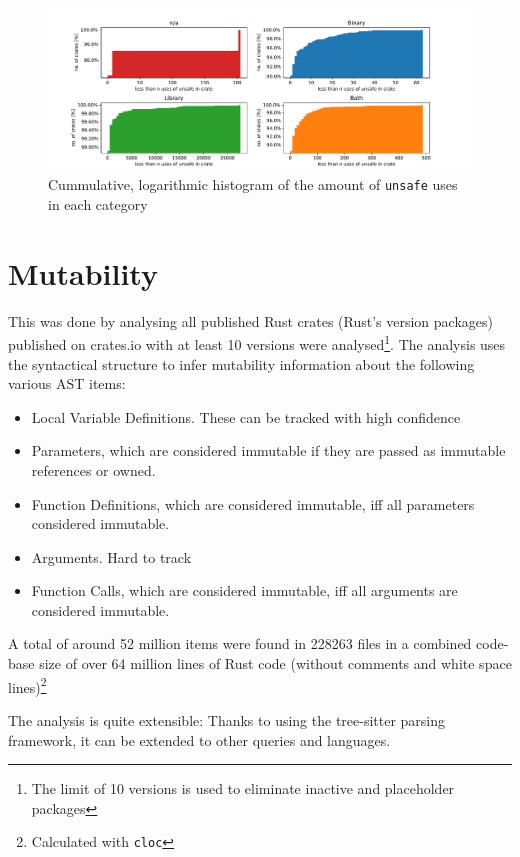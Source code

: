 \documentclass{book}
\newcommand{\code}[1]{\texttt{#1}}
\theoremstyle{definition}
\begin{document}
\begin{figure}[h]
	\centering
	\includegraphics[width=0.99\linewidth, clip, trim={0.2cm 0.2cm 0.2cm 0.2cm}]{../unsafe_counts_by_crate_type.pdf}
	\caption{Cummulative, logarithmic histogram of the amount of \code{unsafe} uses in each category}
	\label{fig:unsafe-hist}
\end{figure}


\section{Mutability}

This was done by analysing all published Rust crates (Rust's version packages) published on crates.io with at least 10 versions were analysed\footnote{The limit of 10 versions is used to eliminate inactive and placeholder packages}. The analysis uses the syntactical structure to infer mutability information about the following various AST items:
\begin{itemize}
	\item Local Variable Definitions. These can be tracked with high confidence
	\item Parameters, which are considered immutable if they are passed as immutable references or owned.
	\item Function Definitions, which are considered immutable, iff all parameters considered immutable.
	\item Arguments. Hard to track
	\item Function Calls, which are considered immutable, iff all arguments are considered immutable.
\end{itemize}
A total of around 52 million items were found in 228263 files in a combined code-base size of over 64 million lines of Rust code (without comments and white space lines)\footnote{Calculated with \texttt{cloc}}

The analysis is quite extensible: Thanks to using the tree-sitter parsing framework, it can be extended to other queries and languages.
\end{document}
